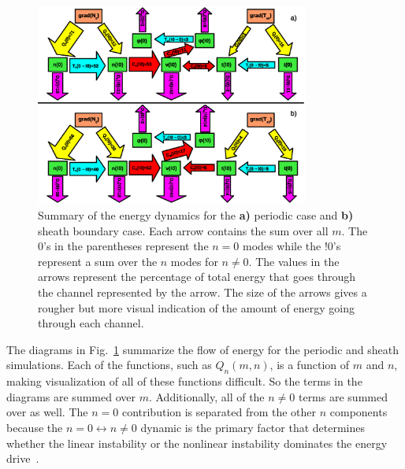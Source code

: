 \documentclass[showpacs,preprintnumbers,amsmath,amssymb,superscriptaddress,aip]{revtex4-1}
\begin{document}
\begin{figure}[!htbp]
\includegraphics[width=0.8\textwidth]{energy_diagrams}
\hfil
\caption{Summary of the energy dynamics for the \textbf{a)} periodic case and \textbf{b)} sheath boundary case. Each arrow contains the sum over all $m$. The 0's in the parentheses
represent the $n=0$ modes while the !0's represent a sum over the $n$ modes for $n \ne 0$. The values in the arrows represent the percentage of total energy that goes through the channel
represented by the arrow. The size of the arrows gives a rougher but more visual indication of the amount of energy going through each channel.}
\label{en_diagrams}
\end{figure}

The diagrams in Fig.~\ref{en_diagrams} summarize the flow of energy for the periodic and sheath simulations. Each of the functions, such as $Q_n(m,n)$, is a function of $m$ and $n$, making
visualization of all of these functions difficult. So the terms in the diagrams are summed over $m$. Additionally, all of the $n \ne 0$ terms are summed over as well.
The $n=0$ contribution is separated from the other $n$ components because
the $n=0 \leftrightarrow n \ne 0$ dynamic is the primary factor that determines whether the linear instability or the nonlinear instability dominates the energy drive~\cite{friedman2012b}.
\end{document}
